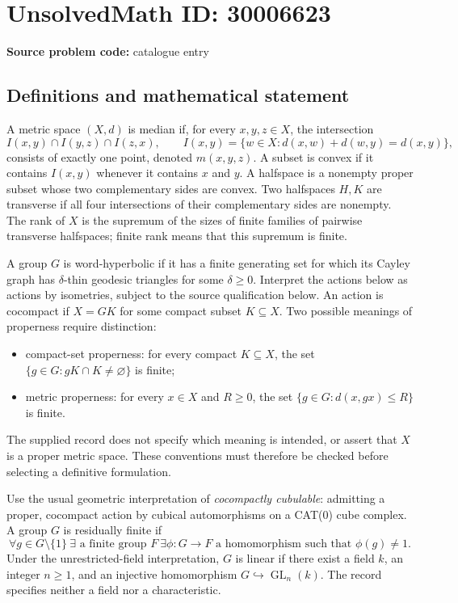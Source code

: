 \documentclass[11pt]{article}
\begin{document}
\section*{UnsolvedMath ID: 30006623}
\textbf{Source problem code:} catalogue entry
\subsection{Definitions and mathematical statement}
A metric space $(X,d)$ is median if, for every $x,y,z\in X$, the intersection
\[
I(x,y)\cap I(y,z)\cap I(z,x),\qquad I(x,y)=\{w\in X:d(x,w)+d(w,y)=d(x,y)\},
\]
consists of exactly one point, denoted $m(x,y,z)$. A subset is convex if it contains $I(x,y)$ whenever it contains $x$ and $y$. A halfspace is a nonempty proper subset whose two complementary sides are convex. Two halfspaces $H,K$ are transverse if all four intersections of their complementary sides are nonempty. The rank of $X$ is the supremum of the sizes of finite families of pairwise transverse halfspaces; finite rank means that this supremum is finite.

A group $G$ is word-hyperbolic if it has a finite generating set for which its Cayley graph has $\delta$-thin geodesic triangles for some $\delta\geq 0$. Interpret the actions below as actions by isometries, subject to the source qualification below. An action is cocompact if $X=G K$ for some compact subset $K\subseteq X$. Two possible meanings of properness require distinction:
\begin{itemize}
\item compact-set properness: for every compact $K\subseteq X$, the set $\{g\in G:gK\cap K\ne\varnothing\}$ is finite;
\item metric properness: for every $x\in X$ and $R\geq 0$, the set $\{g\in G:d(x,gx)\leq R\}$ is finite.
\end{itemize}
The supplied record does not specify which meaning is intended, or assert that $X$ is a proper metric space. These conventions must therefore be checked before selecting a definitive formulation.

Use the usual geometric interpretation of \emph{cocompactly cubulable}: admitting a proper, cocompact action by cubical automorphisms on a CAT(0) cube complex. A group $G$ is residually finite if
\[
\forall g\in G\setminus\{1\}\ \exists\text{ a finite group }F\ \exists\phi:G\to F\text{ a homomorphism such that }\phi(g)\ne 1.
\]
Under the unrestricted-field interpretation, $G$ is linear if there exist a field $k$, an integer $n\geq 1$, and an injective homomorphism $G\hookrightarrow\operatorname{GL}_n(k)$. The record specifies neither a field nor a characteristic.
\end{document}
